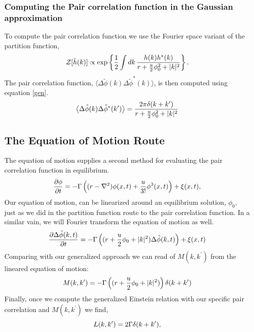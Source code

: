 \subsubsection{Computing the Pair correlation function in the Gaussian
approximation}

To compute the pair correlation function we use the Fourier space variant of
the partition function,
%
\begin{equation} 
    \mathcal{Z}[\tilde{h}(k)] \propto \exp\left\lbrace \frac{1}{2}\int dk\,
        \frac{h(k)h^{*}(k)}{r + \frac{u}{2}\phi_0^2 +  \vert k \vert^2}
        \right\rbrace.
\end{equation} 
%
The pair correlation function, $\langle
\Delta\tilde{\phi}(k)\Delta\tilde{\phi}^{*}(k)\rangle$, is then computed using
equation \ref{gen}.
%
\begin{equation} \left\langle \Delta\tilde{\phi}(k)\Delta\tilde{\phi}^{*}(k^\prime) \right\rangle =
\frac{2\pi \delta(k+k^\prime)}{r + \frac{u}{2}\phi_0^2 + \vert k \vert^2}
\end{equation}
%
\subsection{The Equation of Motion Route} %

The equation of motion supplies a second method for evaluating the pair
correlation function in equilibrium.
%
\begin{equation} \frac{\partial \phi}{\partial t} =
-\Gamma\left((r-\nabla^2)\phi(x,t) + \frac{u}{3!}\phi^3(x,t)\right) + \xi(x, t),
\end{equation}
%
Our equation of motion, can be linearized around an equilibrium solution,
$\phi_0$, just as we did in the partition function route to the pair
correlation function. In a similar vain, we will Fourier transform the equation
of motion as well.
%
\begin{equation} \frac{\partial \Delta\tilde{\phi}(k, t)}{\partial t} = -\Gamma\left((r +
\frac{u}{2}\phi_0 + \vert k \vert^2)\Delta\tilde{\phi}(k,t)\right) + \xi(x,t)
\end{equation}
%
Comparing with our generalized approach we can read of $M(k, k^\prime)$ from
the lineared equation of motion:
%
\begin{equation} M(k, k^\prime) = -\Gamma\left((r + \frac{u}{2}\phi_0 + \vert k
\vert^2)\right)\delta(k + k^\prime) \end{equation}
%
Finally, once we compute the generalized Einstein relation with our specific
pair correlation and $M(k, k^\prime)$ we find,
%
\begin{equation} L(k, k^\prime) = 2\Gamma \delta(k + k^\prime), \end{equation}

